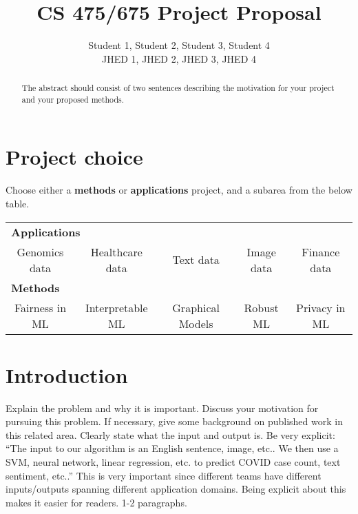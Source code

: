 \documentclass{article}
\title{CS 475/675 Project Proposal}
\author{
  Student 1, Student 2, Student 3, Student 4\\
  JHED 1, JHED 2, JHED 3, JHED 4
}
\newcommand{\Checked}{{\LARGE \XBox}}%
\newcommand{\Unchecked}{{\LARGE \Square}}%
\begin{document}
\maketitle

\begin{abstract}
The abstract should consist of two sentences describing the motivation for your project and your proposed methods.
\end{abstract}

\section{Project choice}

Choose either a {\bf methods} or {\bf applications} project, and a subarea from the below table.
\begin{table}[!h]
\centering
\def\arraystretch{2}
\begin{tabular}{c c c c c }
\toprule
\multicolumn{5}{l}{\Unchecked \bf Applications} \\
\Unchecked Genomics data & 
\Unchecked Healthcare data & 
\Unchecked Text data &
\Unchecked Image data &
\Unchecked Finance data \\
\midrule
\multicolumn{5}{l}{\Unchecked \bf Methods} \\
\Unchecked Fairness in ML &
\Unchecked Interpretable ML &
\Unchecked Graphical Models &
\Unchecked Robust ML &
\Unchecked Privacy in ML \\
\bottomrule
\end{tabular}
\end{table}

\section{Introduction}	
Explain the problem and why it is important. Discuss your motivation for pursuing this
problem. If necessary, give some background on published work in this related area. Clearly state what the input and output
is. Be very explicit: “The input to our algorithm is an {English sentence,
image, etc.}. We then use a {SVM, neural network, linear
regression, etc.} to predict {COVID case count, text sentiment, etc.}.”
This is very important since different teams have different inputs/outputs spanning different
application domains. Being explicit about this makes it easier for readers. 1-2 paragraphs.
\end{document}
